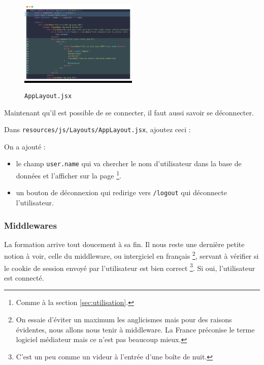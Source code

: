 \newpage


\begin{figure}
    \vspace{-1.5cm}
    \colorbox{black}{\includegraphics[width=0.5\textwidth]{figures-C1/middleware_applayout.png}}
    \caption{\texttt{AppLayout.jsx}}
\end{figure}

Maintenant qu'il est possible de se connecter, il faut aussi savoir se déconnecter.

Dans \texttt{resources/js/Layouts/AppLayout.jsx}, ajoutez ceci :

On a ajouté : 
\begin{itemize}
    \item le champ \texttt{user.name} qui va chercher le nom d'utilisateur dans la base de données et l'afficher sur la page \footnote{Comme à la section \ref{sec:utilisation}.}.
    \item un bouton de déconnexion qui redirige vers \texttt{/logout} qui déconnecte l'utilisateur.
\end{itemize}

\subsubsection[Middlewares][laravel.com/docs/12.x/middleware]{Middlewares}\label{sec:middleware}

La formation arrive tout doucement à sa fin. Il nous reste une dernière petite notion à voir, celle du middleware, ou intergiciel en français \footnote{On essaie d'éviter un maximum les anglicismes mais pour des raisons évidentes, nous allons nous tenir à middleware. La France préconise le terme logiciel médiateur mais ce n'est pas beaucoup mieux.}, servant à vérifier si le cookie de session envoyé par l'utilisateur est bien correct \footnote{C'est un peu comme un videur à l'entrée d'une boîte de nuit.}. Si oui, l'utilisateur est connecté.

